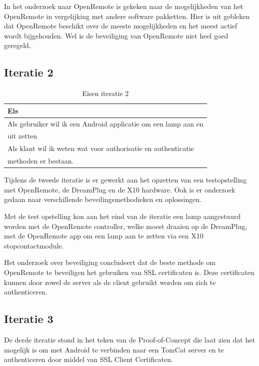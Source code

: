 \documentclass[]{article}
\begin{document}
In het onderzoek naar OpenRemote is gekeken naar de mogelijkheden van het
OpenRemote in vergelijking met andere software pakketten. Hier is uit
gebleken dat OpenRemote beschikt over de meeste mogelijkheden en het meest
actief wordt bijgehouden. Wel is de beveiliging van OpenRemote niet heel
goed geregeld.

\subsection{Iteratie 2}
\begin{table}[htpb]
  \caption{Eisen iteratie 2}
  \begin{center}
    \begin{tabular}{|| l ||}\hline
        Eis                                                              \\\hline\hline
        Als gebruiker wil ik een Android applicatie om een lamp aan en   \\ 
        uit zetten                                                       \\\hline
        Als klant wil ik weten wat voor authorisatie en authenticatie    \\
        methoden er bestaan.                                             \\\hline
    \end{tabular}
  \end{center}
\end{table}

Tijdens de tweede iteratie is er gewerkt aan het opzetten van een
testopstelling met OpenRemote, de DreamPlug en de X10 hardware. Ook is er
onderzoek gedaan naar verschillende beveilingsmethodieken en oplossingen.

Met de test opstelling kon aan het eind van de iteratie een lamp
aangestuurd worden met de OpenRemote controller, welke moest draaien op de
DreamPlug, met de OpenRemote app om een lamp aan te zetten via een X10
stopcontactmodule.

Het onderzoek over beveiliging concludeert dat de beste methode om
OpenRemote te beveiligen het gebruiken van SSL certificaten is. Deze
certificaten kunnen door zowel de server als de client gebruikt worden om
zich te authenticeren.

\subsection{Iteratie 3}
De derde iteratie stond in het teken van de Proof-of-Concept die laat zien
dat het mogelijk is om met Android te verbinden naar een TomCat server en
te authenticeren door middel van SSL Client Certificaten.
\end{document}
